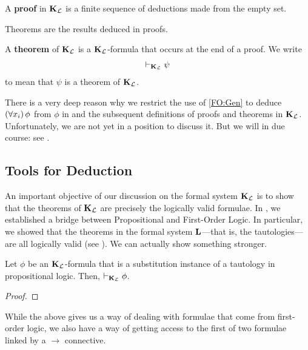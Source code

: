 \begin{boxdefinition}[Proofs in $\KL$]
    A \textbf{proof} in $\KL$ is a finite sequence of deductions made from the empty set.
\end{boxdefinition}

Theorems are the results deduced in proofs.

\begin{boxdefinition}[Theorems in $\KL$]
    A \textbf{theorem} of $\KL$ is a $\KL$-formula that occurs at the end of a proof. We write
    \begin{align*}
        \vdash_{\mathbf{K}_{\mathcal{L}}} \psi
    \end{align*}
    to mean that $\psi$ is a theorem of $\KL$.
\end{boxdefinition}

There is a very deep reason why we restrict the use of \ref{FO:Gen} to deduce $\left( \forall x_i \right)\phi$ from $\phi$ in  and the subsequent definitions of proofs and theorems in $\KL$. Unfortunately, we are not yet in a position to discuss it. But we will in due course: see .

\subsection{Tools for Deduction}

An important objective of our discussion on the formal system $\KL$ is to show that the theorems of $\KL$ are precisely the logically valid formulae. In , we established a bridge between Propositional and First-Order Logic. In particular, we showed that the theorems in the formal system $\mathbf{L}$---that is, the tautologies---are all logically valid (see ). We can actually show something stronger.

\begin{boxtheorem}\label{Ch2:Thm:L_Tauto_Thm_FO}
    Let $\phi$ be an $\KL$-formula that is a substitution instance of a tautology in propositional logic. Then, $\vdash_{\mathbf{K}_{\mathcal{L}}} \phi$.
\end{boxtheorem}
\begin{proof}
    \sorry %
\end{proof}

While the above gives us a way of dealing with formulae that come from first-order logic, we also have a way of getting access to the first of two formulae linked by a $\to$ connective.

